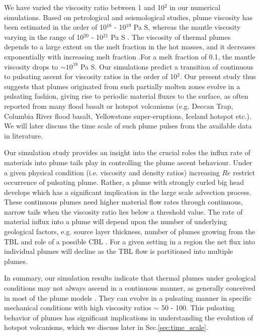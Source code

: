 \documentclass[12pt]{article}
\begin{document}
{We have varied the viscosity ratio between 1 and 10$^2$ in our numerical simulations. Based on petrological and seismological studies, plume viscosity has been estimated in the order of 10$^{18}$ - 10$^{19}$ Pa S, whereas the mantle viscosity varying in the range of 10$^{20}$ - 10$^{21}$ Pa S \cite{scott2006effect}. The viscosity of thermal plumes depends to a large extent 
 on the melt fraction in the hot masses, and it decreases exponentially with increasing melt fraction \cite{scott2006effect}.For a melt fraction of 0.1, the mantle viscosity drops to $\sim 10^{18}$ Pa S. Our simulations predict a transition of continuous to pulsating ascent for viscosity ratios in the order of 10$^2$. Our present study thus suggests that plumes originated from such partially molten zones evolve in a pulsating fashion, giving rise to periodic material fluxes to the surface, as often reported from many flood basalt or hotspot volcanisms (e.g. Deccan Trap, Columbia River flood basalt, Yellowstone super-eruptions, Iceland hotspot etc.). We will later discuss the time scale of such plume pulses from the available data in literature. 


Our simulation study provides an insight into the crucial roles the influx rate of materials into plume tails play in controlling the plume ascent behaviour. Under a given physical condition (i.e. viscosity and density ratios) increasing $Re$ restrict occurrence of pulsating plume. Rather, a plume with strongly curled big head develops which has a significant implication in the large scale advection process. These continuous plumes need higher material flow rates through continuous, narrow tails when the viscosity ratio lies below a threshold value. The rate of material influx into a plume will depend upon the number of underlying geological factors, e.g. source layer thickness, number of plumes growing from the TBL and role of a possible CBL \cite{lin2006dynamics2}. For a given setting in a region the net flux into individual plumes will decline as the TBL flow is partitioned into multiple plumes.


In summary, our simulation results indicate that thermal plumes under geological conditions may not always ascend in a continuous manner, as generally conceived in most of the plume models \cite{van1997evolution, farnetani2002mixing, lin2006dynamics1}. They can evolve in a pulsating manner in specific mechanical conditions with high viscosity ratios $\sim$ 50 - 100. This pulsating behavior of plumes has significant implications in understanding the evolution of hotspot volcanisms, which we discuss later in Sec.\ref{sec:time_scale}.


}
\end{document}
